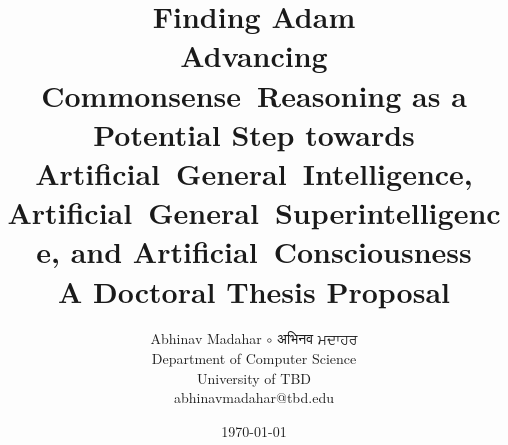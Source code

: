 \title{
    {\huge \textbf{Finding Adam}} \\
    Advancing Commonsense~Reasoning as a Potential Step towards Artificial~General~Intelligence, Artificial~General~Superintelligence, and Artificial~Consciousness
    \vspace{1cm} \\
    A Doctoral Thesis Proposal}

\author{
    Abhinav Madahar $\circ$ {\devanagari अभिनव } {\gurmukhi ਮਦਾਹਰ} \\
    Department of Computer Science \\
    University of TBD \\
    {\small abhinavmadahar@tbd.edu}}

\date{\today}

\maketitle{}
